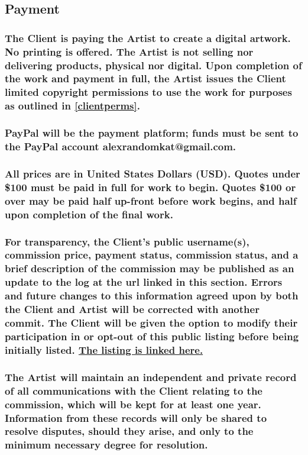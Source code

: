 \documentclass{article}
\begin{document}
\begin{flushleft}
	\leftskip=1cm
	\subsection{Payment} 
	\leftskip=2cm
		\subsubsection[Payment for a Service]{\normalfont The Client is paying the Artist to create a digital artwork. No printing is offered. The Artist is not selling nor delivering products, physical nor digital. Upon completion of the work and payment in full, the Artist issues the Client limited copyright permissions to use the work for purposes as outlined in \ref{clientperms}.}

		\subsubsection[Acceptable Payment Methods]{\normalfont PayPal will be the payment platform; funds must be sent to the PayPal account alexrandomkat@gmail.com.}

		\subsubsection[Payment Plans]{\normalfont All prices are in United States Dollars (USD). Quotes under \$100 must be paid in full for work to begin. Quotes \$100 or over may be paid half up-front before work begins, and half upon completion of the final work.}

		\subsubsection[Public Recordkeeping]{\normalfont For transparency, the Client's public username(s), commission price, payment status, commission status, and a brief description of the commission may be published as an update to the log at the url linked in this section. Errors and future changes to this information agreed upon by both the Client and Artist will be corrected with another commit. The Client will be given the option to modify their participation in or opt-out of this public listing before being initially listed. \href{https://github.com/AlexRandomkat/alexrandomkatCommLog/blob/main/alexrandomkat-commlog-PUBLIC.pdf}{The listing is linked here.}}
		
		\subsubsection[Private Recordkeeping]{\normalfont The Artist will maintain an independent and private record of all communications with the Client relating to the commission, which will be kept for at least one year. Information from these records will only be shared to resolve disputes, should they arise, and only to the minimum necessary degree for resolution.}
		\hphantom{owo}
		

\end{flushleft}
\end{document}
